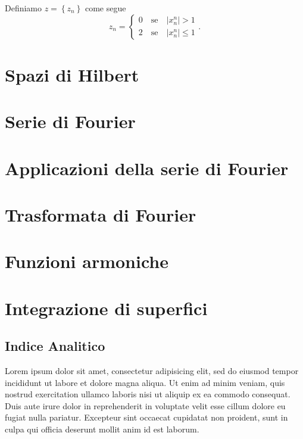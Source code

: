 \documentclass[a4paper, 12pt]{report}
\begin{document}
Definiamo $z = \left\{ z_n \right\}$ come segue
%
$$
z_n = 
\begin{cases}
0 \quad \text{se} \quad | x_n^n | > 1 \\
2 \quad \text{se} \quad | x_n^n | \leq 1
\end{cases}. 
$$
%






\chapter{Spazi di Hilbert}


\chapter{Serie di Fourier}


\chapter{Applicazioni della serie di Fourier}


\chapter{Trasformata di Fourier}


\chapter{Funzioni armoniche}


\chapter{Integrazione di superfici}


\newpage

\section{Indice Analitico}

Lorem ipsum dolor sit amet, consectetur adipisicing elit, sed do eiusmod
tempor incididunt ut labore et dolore magna aliqua. Ut enim ad minim veniam,
quis nostrud exercitation ullamco laboris nisi ut aliquip ex ea commodo
consequat. Duis aute irure dolor in reprehenderit in voluptate velit esse
cillum dolore eu fugiat nulla pariatur. Excepteur sint occaecat cupidatat non
proident, sunt in culpa qui officia deserunt mollit anim id est laborum.
\end{document}
